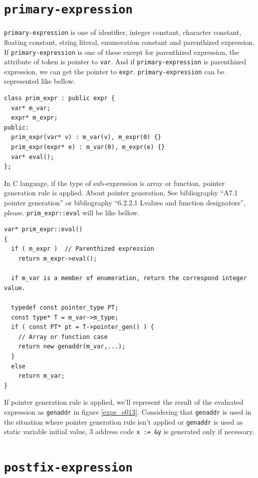 \section{\tt{primary-expression}}
\label{expr_e015}
{\tt{primary-expression}} is one of identifier, integer constant,
character constant, floating constant, string literal, enumeration
constant and parenthized expression. If {\tt{primary-expression}} is 
one of these except for parenthized expression, the attribute of token
is pointer to {\tt{var}}. And if {\tt{primary-expression}} is 
parenthized expression, we can get the pointer to {\tt{expr}}.
{\tt{primary-expression}} can be represented like bellow.
\begin{verbatim}
class prim_expr : public expr {
  var* m_var;
  expr* m_expr;
public:
  prim_expr(var* v) : m_var(v), m_expr(0) {}
  prim_expr(expr* e) : m_var(0), m_expr(e) {}
  var* eval();
};
\end{verbatim}

In C language, if the type of sub-expression is array or function,
pointer generation rule is applied. About pointer generation,
See bibliography
\cite{KR} ``A7.1 pointer generation'' or
bibliography \cite{ISO} ``6.2.2.1 Lvalues and function designators'', please.
{\tt{prim\_expr::eval}} will be like bellow.
\begin{verbatim}
var* prim_expr::eval()
{
  if ( m_expr )  // Parenthized expression
    return m_expr->eval();

  if m_var is a member of enumeration, return the correspond integer value.

  typedef const pointer_type PT;
  const type* T = m_var->m_type;
  if ( const PT* pt = T->pointer_gen() ) {
    // Array or function case
    return new genaddr(m_var,...);
  }
  else
    return m_var;
}
\end{verbatim}
If pointer generation rule is applied, we'll represent the result of
the evaluated expression as {\tt{genaddr}} in figure \ref{expr_e013}.
Considering that {\tt{genaddr}} is used in the situation
where pointer generation rule isn't applied or {\tt{genaddr}} is used
as static variable initial value,
3 address code {\tt{x := \&y}} is generated only if necessary.

\section{\tt{postfix-expression}}

